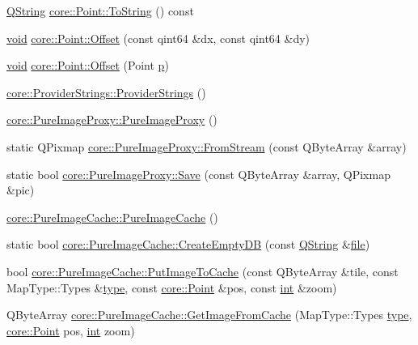 \begin{DoxyCompactItemize}
\hyperlink{group___u_a_v_objects_plugin_gab9d252f49c333c94a72f97ce3105a32d}{Q\-String} \hyperlink{group___o_p_map_widget_gabfd5368c170cc03b85baf6c32c56f11a}{core\-::\-Point\-::\-To\-String} () const 
\item 
\hyperlink{group___u_a_v_objects_plugin_ga444cf2ff3f0ecbe028adce838d373f5c}{void} \hyperlink{group___o_p_map_widget_ga6ffa19db824186dac9bac22ebf314e3e}{core\-::\-Point\-::\-Offset} (const qint64 \&dx, const qint64 \&dy)
\item 
\hyperlink{group___u_a_v_objects_plugin_ga444cf2ff3f0ecbe028adce838d373f5c}{void} \hyperlink{group___o_p_map_widget_ga31f14855ca1e292676db909b2b0f1c11}{core\-::\-Point\-::\-Offset} (Point \hyperlink{glext_8h_aa5367c14d90f462230c2611b81b41d23}{p})
\item 
\hyperlink{group___o_p_map_widget_ga1ecf05c742cf2e3d35cffadb55e73ba2}{core\-::\-Provider\-Strings\-::\-Provider\-Strings} ()
\item 
\hyperlink{group___o_p_map_widget_ga6c0425d3ca7f1f64fcfa477e419df111}{core\-::\-Pure\-Image\-Proxy\-::\-Pure\-Image\-Proxy} ()
\item 
static Q\-Pixmap \hyperlink{group___o_p_map_widget_gaadda67144242dbc72eecd8bf5e4ad935}{core\-::\-Pure\-Image\-Proxy\-::\-From\-Stream} (const Q\-Byte\-Array \&array)
\item 
static bool \hyperlink{group___o_p_map_widget_ga90956060e74b0bed45a12b6b99995c82}{core\-::\-Pure\-Image\-Proxy\-::\-Save} (const Q\-Byte\-Array \&array, Q\-Pixmap \&pic)
\item 
\hyperlink{group___o_p_map_widget_ga28510761dcb972fdc54b26b91f199770}{core\-::\-Pure\-Image\-Cache\-::\-Pure\-Image\-Cache} ()
\item 
static bool \hyperlink{group___o_p_map_widget_gac23ecdf49009e55e9e7358c990f32bfa}{core\-::\-Pure\-Image\-Cache\-::\-Create\-Empty\-D\-B} (const \hyperlink{group___u_a_v_objects_plugin_gab9d252f49c333c94a72f97ce3105a32d}{Q\-String} \&\hyperlink{uavobjecttemplate_8m_a97c04efa65bcf0928abf9260bc5cbf46}{file})
\item 
bool \hyperlink{group___o_p_map_widget_gaabe1bf4c819005ff575270660c86503e}{core\-::\-Pure\-Image\-Cache\-::\-Put\-Image\-To\-Cache} (const Q\-Byte\-Array \&tile, const Map\-Type\-::\-Types \&\hyperlink{glext_8h_a7d05960f4f1c1b11f3177dc963a45d86}{type}, const \hyperlink{structcore_1_1_point}{core\-::\-Point} \&pos, const \hyperlink{ioapi_8h_a787fa3cf048117ba7123753c1e74fcd6}{int} \&zoom)
\item 
Q\-Byte\-Array \hyperlink{group___o_p_map_widget_gae7df6a861aa9bec0d6cb196ef1de84b1}{core\-::\-Pure\-Image\-Cache\-::\-Get\-Image\-From\-Cache} (Map\-Type\-::\-Types \hyperlink{glext_8h_a7d05960f4f1c1b11f3177dc963a45d86}{type}, \hyperlink{structcore_1_1_point}{core\-::\-Point} pos, \hyperlink{ioapi_8h_a787fa3cf048117ba7123753c1e74fcd6}{int} zoom)

\end{DoxyCompactItemize}
